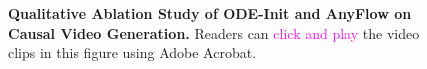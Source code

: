 \begin{figure}[!tb]
  \centering
  \vspace{-.3in}\caption{\textbf{Qualitative Ablation Study of ODE-Init and AnyFlow on Causal Video Generation.} Readers can \textcolor{magenta}{click and play} the video clips in this figure using Adobe Acrobat.}
  \label{fig:ablation_odeinit}
\end{figure}

